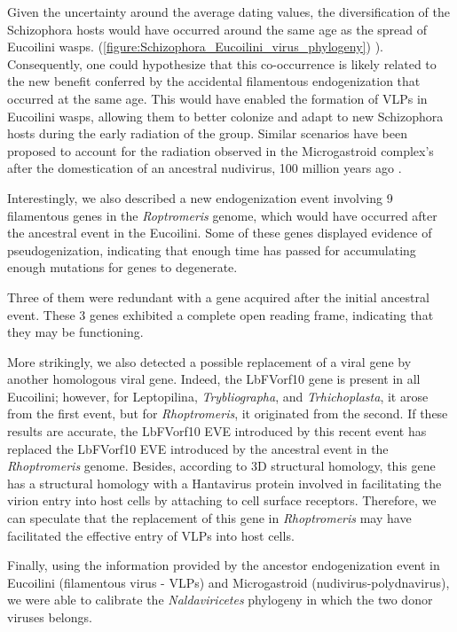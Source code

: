 Given the uncertainty around the average dating values, the diversification of the Schizophora hosts would have occurred around the same age as the spread of Eucoilini wasps. (\figurename{\ref{figure:Schizophora_Eucoilini_virus_phylogeny}}) \citep{blaimer_comprehensive_2020}). Consequently, one could hypothesize that this co-occurrence is likely related to the new benefit conferred by the accidental filamentous endogenization that occurred at the same age. This would have enabled the formation of VLPs in Eucoilini wasps, allowing them to better colonize and adapt to new Schizophora hosts during the early radiation of the group. Similar scenarios have been proposed to account for the radiation observed in the Microgastroid complex's after the   domestication of an ancestral nudivirus, 100 million years ago \citep{whitfield_virus_2003, bezier_bracovirus_2008}.

Interestingly, we also described a new endogenization event involving 9 filamentous genes in the \textit{Roptromeris} genome, which would have occurred after the ancestral event in the Eucoilini. Some of these genes displayed evidence of pseudogenization, indicating that enough time has passed for accumulating enough mutations for genes to degenerate. 

Three of them were redundant with a gene acquired after the initial ancestral event. These 3 genes exhibited a complete open reading frame, indicating that they may be functioning. 

More strikingly, we also detected a possible replacement of a viral gene by another homologous viral gene. Indeed, the LbFVorf10 gene is present in all Eucoilini; however, for Leptopilina, \textit{Trybliographa}, and \textit{Trhichoplasta}, it arose from the first event, but for \textit{Rhoptromeris}, it originated from the second. If these results are accurate, the LbFVorf10 EVE introduced by this recent event has replaced the LbFVorf10 EVE introduced by the ancestral event in the \textit{Rhoptromeris} genome. Besides,  according to 3D structural homology, this gene has a structural homology with a Hantavirus protein involved in facilitating the virion entry into host cells by attaching to cell surface receptors. Therefore, we can speculate that the replacement of this gene in \textit{Rhoptromeris} may have facilitated the effective entry of VLPs into host cells.  

Finally, using the information provided by the ancestor endogenization event in Eucoilini (filamentous virus - VLPs) and Microgastroid (nudivirus-polydnavirus), we were able to calibrate the \textit{Naldaviricetes} phylogeny in which the two donor viruses belongs.  

